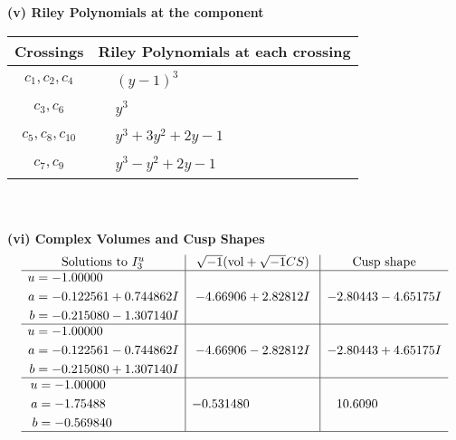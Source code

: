 \documentclass[1p]{elsarticle_modified}
\theoremstyle{definition}
\newcommand{\I}{\sqrt{-1}}
\begin{document}
\newpage\renewcommand{\arraystretch}{1}
\flushleft \textbf{(v) Riley Polynomials at the component}\newline \\
\begin{tabular}{m{50pt}|m{274pt}}
Crossings & \hspace{64pt}Riley Polynomials at each crossing \\
\hline $$\begin{aligned}c_{1},c_{2},c_{4}\end{aligned}$$&$\begin{aligned}
&(y-1)^3
\end{aligned}$\\
\hline $$\begin{aligned}c_{3},c_{6}\end{aligned}$$&$\begin{aligned}
&y^3
\end{aligned}$\\
\hline $$\begin{aligned}c_{5},c_{8},c_{10}\end{aligned}$$&$\begin{aligned}
&y^3+3 y^2+2 y-1
\end{aligned}$\\
\hline $$\begin{aligned}c_{7},c_{9}\end{aligned}$$&$\begin{aligned}
&y^3- y^2+2 y-1
\end{aligned}$\\
\hline
\end{tabular}\\~\\
\newpage\flushleft \textbf{(vi) Complex Volumes and Cusp Shapes}
$$\begin{array}{c|c|c}  
\text{Solutions to }I^u_{3}& \I (\text{vol} + \sqrt{-1}CS) & \text{Cusp shape}\\
 \hline 
\begin{aligned}
u &= -1.00000\phantom{ +0.000000I} \\
a &= -0.122561 + 0.744862 I \\
b &= -0.215080 - 1.307140 I\end{aligned}
 & -4.66906 + 2.82812 I & -2.80443 - 4.65175 I \\ \hline\begin{aligned}
u &= -1.00000\phantom{ +0.000000I} \\
a &= -0.122561 - 0.744862 I \\
b &= -0.215080 + 1.307140 I\end{aligned}
 & -4.66906 - 2.82812 I & -2.80443 + 4.65175 I \\ \hline\begin{aligned}
u &= -1.00000\phantom{ +0.000000I} \\
a &= -1.75488\phantom{ +0.000000I} \\
b &= -0.569840\phantom{ +0.000000I}\end{aligned}
 & -0.531480\phantom{ +0.000000I} & \phantom{-}10.6090\phantom{ +0.000000I}\\
 \hline 
 \end{array}$$\newpage
\end{document}
